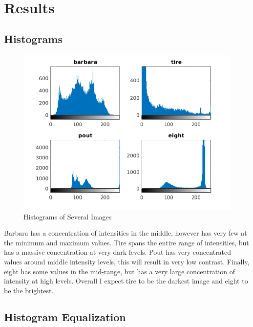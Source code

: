\section{Results}

\subsection{Histograms}

\begin{figure}[H]
    \centering
    \includegraphics[scale=0.75]{histogram_compare.png}
    \caption{Histograms of Several Images}
\end{figure}

Barbara has a concentration of intensities in the middle, however has very few
at the minimum and maximum values. Tire spans the entire range of intensities,
but has a massive concentration at very dark levels. Pout has very concentrated
values around middle intensity levels, this will result in very low contrast.
Finally, eight has some values in the mid-range, but has a very large
concentration of intensity at high levels. Overall I expect tire to be the
darkest image and eight to be the brightest.

\subsection{Histogram Equalization}


